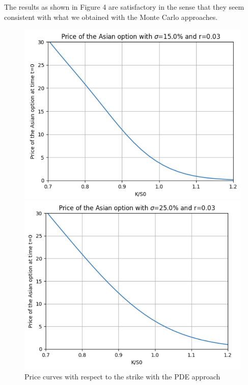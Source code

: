 \documentclass{article}
\begin{document}
The results as shown in Figure 4 are satisfactory in the sense that they seem consistent with what we obtained
with the Monte Carlo approaches. 
\begin{figure}[h]
  \centering
  \begin{minipage}{0.45\textwidth}
    \centering
    \includegraphics[width=\textwidth]{charts/Price_alone15.png}
  
  \end{minipage}\hfill
  \begin{minipage}{0.45\textwidth}
    \centering
    \includegraphics[width=\textwidth]{charts/Price_alone_25.png}
    
  \end{minipage}
  \caption{Price curves with respect to the strike with the PDE approach}
\end{figure}
\end{document}
